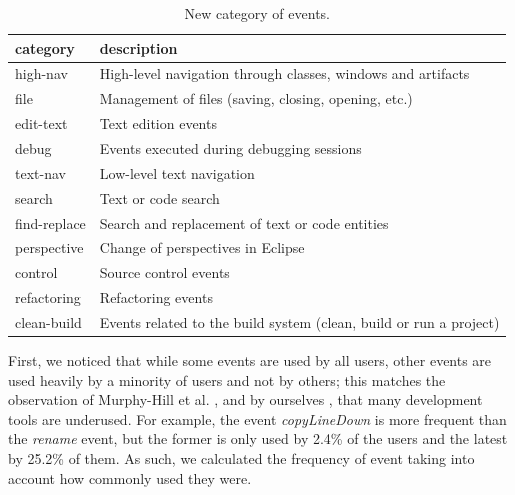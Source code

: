 \documentclass[times]{smrauth}
\begin{document}
\begin{table}[ht!]
	\small
	\renewcommand{\arraystretch}{1.3}
	\caption{New category of events. }
	\label{tbl:new_events_udc}
	\centering
	\begin{tabular}{|p{2.5cm}|p{10 cm}| } %
		\hline 
		category & description \\ %
		\hline 
		\hline 
		high-nav & High-level navigation through classes, windows and artifacts \\ %
		file & Management of files (saving, closing, opening, etc.) \\ %
		edit-text & Text edition events \\ %
		debug & Events executed during debugging sessions \\ %
		text-nav & Low-level text navigation \\ %
		search & Text or code search \\ %
		find-replace & Search and replacement of text or code entities \\ %
		perspective & Change of perspectives in Eclipse \\ %
		control & Source control events \\ %
		refactoring & Refactoring events \\ %
		clean-build &  Events related to the build system (clean, build or run a project) \\ %
		\hline
	\end{tabular}
\end{table}

First, we noticed that while some events are used by all users, other events are used heavily by a minority of users and not by others; this matches the observation of Murphy-Hill et al. \cite{MPB12}, and by ourselves \cite{KubelkaBCGRRS15}, that many development tools are underused. For example, the event \textit{copyLineDown} is more frequent than the \textit{rename} event, but the former is only used by 2.4\% of the users and the latest by 25.2\% of them. As such, we calculated the frequency of event taking into account how commonly used they were.
\end{document}
